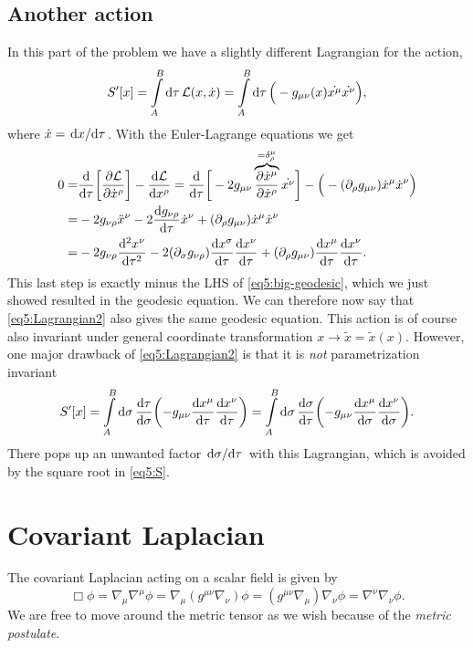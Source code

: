 \documentclass[11pt,a4paper, 
swedish, english %
]{article}
\begin{document}
\subsection{Another action}
In this part of the problem we have a slightly different Lagrangian
for the action,
\begin{equation}\label{eq5:Lagrangian2}
S'[x]=\int_A^B\rd\tau\,\mathcal{L}(x,\dot{x})
=\int_A^B\rd\tau\,\Big(-g_{\mu\nu}(x)\dot{x^\mu}\dot{x^\nu}\Big),
\end{equation}
where $\dot{x}=\dv*{x}{\tau}$. With the Euler-Lagrange equations we
get
\vspace{-1ex}
\begin{equation}
\begin{aligned}
0=&
\dv{\tau}\qty[\pdv{\mathcal{L}}{\dot{x}^\rho}]
-\dv{\mathcal{L}}{{x}^\rho}
=\dv{\tau}\bigg[-2g_{\mu\nu}
\overbrace{\pdv{\dot{x}^\mu}{\dot{x}^\rho}}^{=\delta^\mu_\rho}
\dot{x^\nu}\bigg]
-\Big(-(\partial_{\rho}g_{\mu\nu})\dot{x}^{\mu}\dot{x}^\nu\Big)\\
=&-2g_{\nu\rho}\ddot{x}^\nu
-2\dv{g_{\nu\rho}}{\tau}\dot{x}^\nu
+(\partial_{\rho}g_{\mu\nu})\dot{x}^{\mu}\dot{x}^\nu\\
=&-2g_{\nu\rho}\dv[2]{x^\nu}{\tau}
-2(\partial_{\sigma}g_{\nu\rho})\dv{x^\sigma}{\tau}\dv{x^\nu}{\tau}
+(\partial_{\rho}g_{\mu\nu})\dv{x^{\mu}}{\tau}\dv{x^\nu}{\tau}.
\end{aligned}
\end{equation}
This last step is exactly minus the LHS of \eqref{eq5:big-geodesic},
which we just showed resulted in the geodesic equation. We can
therefore now say that \eqref{eq5:Lagrangian2} also gives the same
geodesic equation. This action is of course also invariant under
general coordinate transformation
$x\to\tilde{x}=\tilde{x}(x)$. However, one major drawback of
\eqref{eq5:Lagrangian2} is that it is \emph{not} parametrization
invariant 
\begin{equation}
S'[x]=\int_A^B\rd\sigma\,\dv{\tau}{\sigma}
\qty(-g_{\mu\nu}\dv{x^\mu}{\tau}\dv{x^\nu}{\tau})
=\int_A^B\rd\sigma\,\dv{\sigma}{\tau}
\qty(-g_{\mu\nu}\dv{x^\mu}{\sigma}\dv{x^\nu}{\sigma}).
\end{equation}
There pops up an unwanted factor $\dv*{\sigma}{\tau}$ with this
Lagrangian, which is avoided by the square root in \eqref{eq5:S}.

\section{Covariant Laplacian}
\swapcommands{\phi}{\varphi}
The covariant Laplacian acting on a scalar field is given by
\begin{equation}
\Box\phi=\nabla_\mu\nabla^\mu\phi=\nabla_\mu(g^{\mu\nu}\nabla_\nu)\phi
=(g^{\mu\nu}\nabla_\mu)\nabla_\nu\phi
=\nabla^\nu\nabla_\nu\phi.
\end{equation}
We are free to move around the metric tensor as we wish because of the
\emph{metric postulate}.
\end{document}
